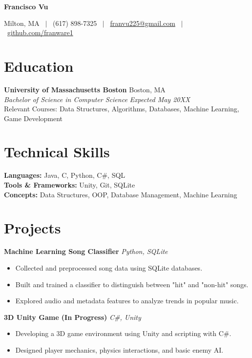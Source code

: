 \documentclass[a4paper,10pt]{article}
\begin{document}
\centerline{\huge \bf Francisco Vu}
\centerline{Milton, MA \ $|$ \ (617) 898-7325 \ $|$ \ \href{mailto:franvu225@gmail.com}{franvu225@gmail.com} \ $|$ \ \href{https://github.com/franware1}{github.com/franware1}}

\section*{Education}
\textbf{University of Massachusetts Boston} \hfill Boston, MA \\
\textit{Bachelor of Science in Computer Science} \hfill \textit{Expected May 20XX} \\
Relevant Courses: Data Structures, Algorithms, Databases, Machine Learning, Game Development

\section*{Technical Skills}
\textbf{Languages:} Java, C, Python, C\#, SQL \\
\textbf{Tools \& Frameworks:} Unity, Git, SQLite \\
\textbf{Concepts:} Data Structures, OOP, Database Management, Machine Learning

\section*{Projects}
\textbf{Machine Learning Song Classifier} \hfill \textit{Python, SQLite} \\
\begin{itemize}[leftmargin=0.15in]
  \item Collected and preprocessed song data using SQLite databases.
  \item Built and trained a classifier to distinguish between "hit" and "non-hit" songs.
  \item Explored audio and metadata features to analyze trends in popular music.
\end{itemize}

\textbf{3D Unity Game (In Progress)} \hfill \textit{C\#, Unity} \\
\begin{itemize}[leftmargin=0.15in]
  \item Developing a 3D game environment using Unity and scripting with C\#.
  \item Designed player mechanics, physics interactions, and basic enemy AI.
\end{itemize}
\end{document}
